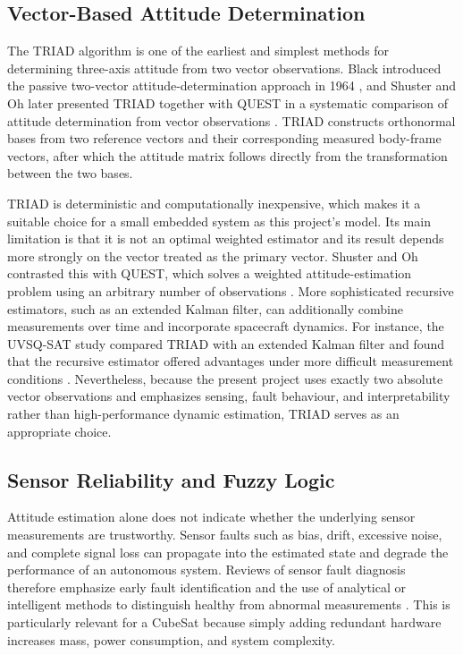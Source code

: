 \documentclass[11pt,a4paper]{article}
\begin{document}
\subsection{Vector-Based Attitude Determination}

The TRIAD algorithm is one of the earliest and simplest methods for determining three-axis attitude from two vector observations. Black introduced the passive two-vector attitude-determination approach in 1964 \cite{black1964triad}, and Shuster and Oh later presented TRIAD together with QUEST in a systematic comparison of attitude determination from vector observations \cite{shuster1981triad}. TRIAD constructs orthonormal bases from two reference vectors and their corresponding measured body-frame vectors, after which the attitude matrix follows directly from the transformation between the two bases.

TRIAD is deterministic and computationally inexpensive, which makes it a suitable choice for a small embedded system as this project's model. Its main limitation is that it is not an optimal weighted estimator and its result depends more strongly on the vector treated as the primary vector. Shuster and Oh contrasted this with QUEST, which solves a weighted attitude-estimation problem using an arbitrary number of observations \cite{shuster1981triad}. More sophisticated recursive estimators, such as an extended Kalman filter, can additionally combine measurements over time and incorporate spacecraft dynamics. For instance, the UVSQ-SAT study compared TRIAD with an extended Kalman filter and found that the recursive estimator offered advantages under more difficult measurement conditions \cite{finance2021uvsqsat}. Nevertheless, because the present project uses exactly two absolute vector observations and emphasizes sensing, fault behaviour, and interpretability rather than high-performance dynamic estimation, TRIAD serves as an appropriate choice.

\subsection{Sensor Reliability and Fuzzy Logic}

Attitude estimation alone does not indicate whether the underlying sensor measurements are trustworthy. Sensor faults such as bias, drift, excessive noise, and complete signal loss can propagate into the estimated state and degrade the performance of an autonomous system. Reviews of sensor fault diagnosis therefore emphasize early fault identification and the use of analytical or intelligent methods to distinguish healthy from abnormal measurements \cite{li2020sensorfault}. This is particularly relevant for a CubeSat because simply adding redundant hardware increases mass, power consumption, and system complexity.
\end{document}
